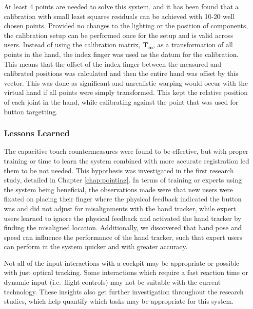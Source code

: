 At least 4 points are needed to solve this system, and it has been found that a calibration with small least squares residuals can be achieved with 10-20 well chosen points.
Provided no changes to the lighting or the position of components, the calibration setup can be performed once for the setup and is valid across users.
Instead of using the calibration matrix, $\mathbf{T_m}$, as a transformation of all points in the hand, the index finger was used as the datum for the calibration.
This means that the offset of the index finger between the measured and calibrated positions was calculated and then the entire hand was offset by this vector.
This was done as significant and unrealistic warping would occur with the virtual hand if all points were simply transformed.
This kept the relative position of each joint in the hand, while calibrating against the point that was used for button targetting.

\subsubsection{Lessons Learned}

The capacitive touch countermeasures were found to be effective, but with proper training or time to learn the system combined with more accurate registration led them to be not needed.
This hypothesis was investigated in the first research study, detailed in Chapter \ref{chap:pointing}.
In terms of training or experts using the system being beneficial, the observations made were that new users were fixated on placing their finger where the physical feedback indicated the button was and did not adjust for misalignments with the hand tracker, while expert users learned to ignore the physical feedback and activated the hand tracker by finding the misaligned location.
Additionally, we discovered that hand pose and speed can influence the performance of the hand tracker, such that expert users can perform in the system quicker and with greater accuracy.

Not all of the input interactions with a cockpit may be appropriate or possible with just optical tracking.
Some interactions which require a fast reaction time or dynamic input (i.e.\ flight controls) may not be suitable with the current technology.
These insights also get further investigation throughout the research studies, which help quantify which tasks may be appropriate for this system.

